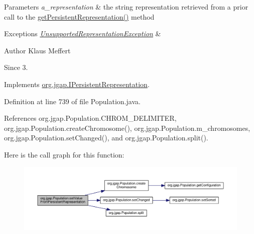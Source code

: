 \begin{DoxyParams}{Parameters}
{\em a\-\_\-representation} & the string representation retrieved from a prior call to the \hyperlink{classorg_1_1jgap_1_1_population_afeedd380ea603cdefb5ef871f2bdf99e}{get\-Persistent\-Representation()} method\\
\hline
\end{DoxyParams}

\begin{DoxyExceptions}{Exceptions}
{\em \hyperlink{classorg_1_1jgap_1_1_unsupported_representation_exception}{Unsupported\-Representation\-Exception}} & \\
\hline
\end{DoxyExceptions}
\begin{DoxyAuthor}{Author}
Klaus Meffert 
\end{DoxyAuthor}
\begin{DoxySince}{Since}
3. 
\end{DoxySince}


Implements \hyperlink{interfaceorg_1_1jgap_1_1_i_persistent_representation_a94a345f1919c4840dd0b9eecf7afc6a3}{org.\-jgap.\-I\-Persistent\-Representation}.



Definition at line 739 of file Population.\-java.



References org.\-jgap.\-Population.\-C\-H\-R\-O\-M\-\_\-\-D\-E\-L\-I\-M\-I\-T\-E\-R, org.\-jgap.\-Population.\-create\-Chromosome(), org.\-jgap.\-Population.\-m\-\_\-chromosomes, org.\-jgap.\-Population.\-set\-Changed(), and org.\-jgap.\-Population.\-split().



Here is the call graph for this function\-:
\nopagebreak
\begin{figure}[H]
\begin{center}
\leavevmode
\includegraphics[width=350pt]{classorg_1_1jgap_1_1_population_a5cb0aa594a5d3d089ea0cadbe9a002e8_cgraph}
\end{center}
\end{figure}


